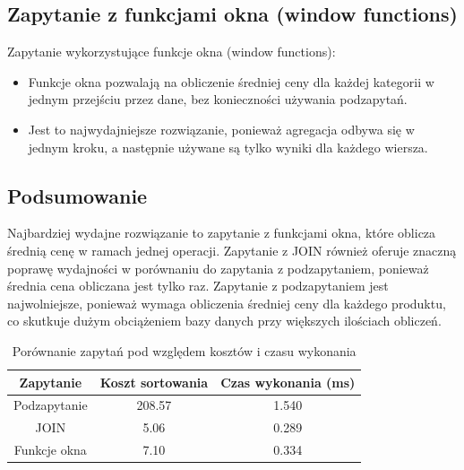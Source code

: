 \documentclass{article}
\begin{document}
\subsection{Zapytanie z funkcjami okna (window functions)}

Zapytanie wykorzystujące funkcje okna (window functions):
\begin{itemize}
    \item Funkcje okna pozwalają na obliczenie średniej ceny dla każdej kategorii w jednym przejściu przez dane, bez konieczności używania podzapytań.
    \item Jest to najwydajniejsze rozwiązanie, ponieważ agregacja odbywa się w jednym kroku, a następnie używane są tylko wyniki dla każdego wiersza.
\end{itemize}

\subsection{Podsumowanie}

Najbardziej wydajne rozwiązanie to zapytanie z funkcjami okna, które oblicza średnią cenę w ramach jednej operacji. Zapytanie z JOIN również oferuje znaczną poprawę wydajności w porównaniu do zapytania z podzapytaniem, ponieważ średnia cena obliczana jest tylko raz. Zapytanie z podzapytaniem jest najwolniejsze, ponieważ wymaga obliczenia średniej ceny dla każdego produktu, co skutkuje dużym obciążeniem bazy danych przy większych ilościach obliczeń.

\begin{table}[h]
\centering
\begin{tabular}{|c|c|c|}
\hline
\textbf{Zapytanie} & \textbf{Koszt sortowania} & \textbf{Czas wykonania (ms)} \\
\hline
Podzapytanie & 208.57 & 1.540 \\
JOIN & 5.06 & 0.289 \\
Funkcje okna & 7.10 & 0.334 \\
\hline
\end{tabular}
\caption{Porównanie zapytań pod względem kosztów i czasu wykonania}
\end{table}
\end{document}

